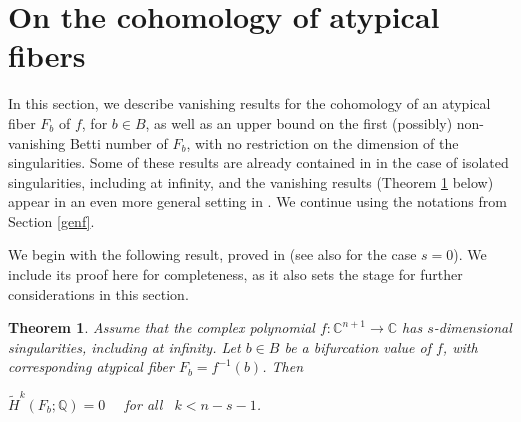 \documentclass[12pt,leqno,twoside]{amsart}
\newtheorem{theorem}{Theorem}[section]
\theoremstyle{remark}
\theoremstyle{remark}
\theoremstyle{definition}
\theoremstyle{remark}
\theoremstyle{remark}
\theoremstyle{remark}
\numberwithin{equation}{section}  %
\def\bt{\begin{theorem}}
\def\et{\end{theorem}}
\newcommand{\bC}{\mathbb{C}}
\newcommand{\bQ}{\mathbb{Q}}
\newcommand{\wti}{\widetilde}
\begin{document}

\section{On the cohomology of atypical fibers}\label{atyp}
In this section, we describe vanishing results for the cohomology of an atypical fiber $F_b$ of $f$, for $b \in B$, as well as an upper bound on the first (possibly) non-vanishing Betti number of $F_b$, with no restriction on the dimension of the singularities. Some of these results are already contained in \cite[Sections 6.2, 6.3]{Di} in the case of isolated singularities, including at infinity, and the vanishing results (Theorem \ref{tat} below) appear in an even more general setting in \cite{Bre}. %
We continue using  the notations from Section \ref{genf}.

We begin with the following result, proved in \cite[Thm.3.1]{Bre} (see also \cite[Thm.6.3.23(iii)]{Di} for the case $s=0$). We include its proof here for  completeness, as it also sets the stage for further considerations in this section.  

\bt\label{tat}
Assume that the complex polynomial $f\colon \bC^{n+1} \to \bC$ has $s$-dimensional singularities, including at infinity. Let $b \in B$ be a bifurcation value of $f$, with corresponding atypical fiber $F_b=f^{-1}(b)$. Then 
\begin{center}
$\wti{H}^k(F_b;\bQ)=0$ \ \ for all \ $k < n-s-1$.
\end{center}
\et
\end{document}
